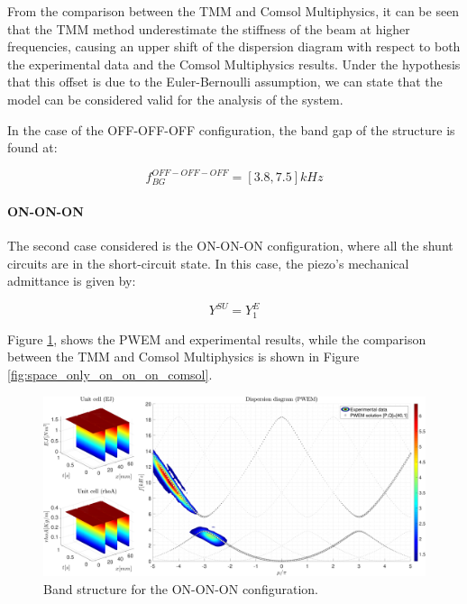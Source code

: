From the comparison between the TMM and Comsol Multiphysics, it can be seen that the TMM method underestimate the stiffness of the beam at higher frequencies, causing an upper shift of the dispersion diagram with respect to both the experimental data and the Comsol Multiphysics results.
Under the hypothesis that this offset is due to the Euler-Bernoulli assumption, we can state that the model can be considered valid for the analysis of the system.

In the case of the OFF-OFF-OFF configuration, the band gap of the structure is found at:

\begin{equation}
    f_{BG}^{OFF-OFF-OFF} = [3.8, 7.5] kHz
\end{equation}



\paragraph{ON-ON-ON}

The second case considered is the ON-ON-ON configuration, where all the shunt circuits are in the short-circuit state.
In this case, the piezo's mechanical admittance is given by:

\begin{equation}
    Y^{SU} = Y_1^E
\end{equation}

Figure \ref{fig:space_only_on_on_on}, shows the PWEM and experimental results, while the comparison between the TMM and Comsol Multiphysics is shown in Figure \ref{fig:space_only_on_on_on_comsol}.

\begin{figure}[H]
    \centering
    \includegraphics[width=\textwidth]{./img/MATLAB/PWEM_EXP ON-ON-ON @0kHz.pdf}
    \caption{Band structure for the ON-ON-ON configuration.}
    \label{fig:space_only_on_on_on}
\end{figure}

